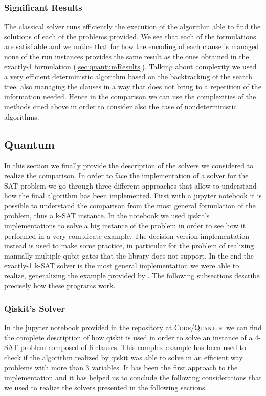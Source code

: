 \documentclass[english]{article}
\begin{document}
			\subsubsection{Significant Results}
			\label{sec:classicResults}
				The classical solver runs efficiently the execution of the algorithm able to find the solutions of each of the problems provided. We see that each of the formulations are satisfiable and we notice that for how the encoding of each clause is managed none of the run instances provides the same result as the ones obtained in the exactly-1 formulation (\ref{sec:quantumResults}). Talking about complexity we used a very efficient deterministic algorithm based on the backtracking of the search tree, also managing the clauses in a way that does not bring to a repetition of the information needed. Hence in the comparison we can use the complexities of the methods cited above in order to consider also the case of nondeterministic algorithms.
				
		\subsection{Quantum}
		\label{sec:satQuantum}
			In this section we finally provide the description of the solvers we considered to realize the comparison. In order to face the implementation of a solver for the SAT problem we go through three different approaches that allow to understand how the final algorithm has been implemented. First with a jupyter notebook it is possible to understand the comparison from the most general formulation of the problem, thus a k-SAT instance. In the notebook we used qiskit's implementations to solve a big instance of the problem in order to see how it performed in a very complicate example. The decision version implementation instead is used to make some practice, in particular for the problem of realizing manually multiple qubit gates that the library does not support. In the end the exactly-1 k-SAT solver is the most general implementation we were able to realize, generalizing the example provided by \cite[Nannicini G.]{introNoPh}. The following subsections describe precisely how these programs work.
		
			\subsubsection{Qiskit's Solver}
			\label{sec:quantumQiskitSolver}
				In the jupyter notebook provided in the repository at \textsc{Code/Quantum} we can find the complete description of how qiskit is used in order to solve an instance of a 4-SAT problem composed of 6 clauses. This complex example has been used to check if the algorithm realized by qiskit was able to solve in an efficient way problems with more than 3 variables. It has been the first approach to the implementation and it has helped us to conclude the following considerations that we used to realize the solvers presented in the following sections. \\
				
\end{document}
